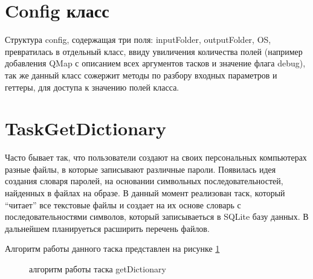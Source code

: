 \section{Config класс}

Структура config, содержащая три поля: inputFolder, outputFolder, OS, превратилась в отдельный класс, ввиду увиличения количества полей (например добавления QMap с описанием всех аргументов тасков и значение флага debug), так же данный класс сожержит методы по разбору входных параметров и геттеры, для доступа к значению полей класса. 

\section{TaskGetDictionary}

Часто бывает так, что пользователи создают на своих персональных компьютерах разные файлы, в которые записывают различные пароли. Появилась идея создания словаря паролей, на основании символьных последовательностей, найденных в файлах на образе. В данный момент реализован таск, который ``читает'' все текстовые файлы и создает на их основе словарь с последовательностями символов, который записываеться в SQLite базу данных. В дальнейшем планируеться расширить перечень файлов.

Алгоритм работы данного таска представлен на рисунке \ref{png:TaskGetDictionary}

\newpage
\begin{figure}[h]
 \caption{алгоритм работы таска getDictionary}
 \label{png:TaskGetDictionary}
\end{figure}
